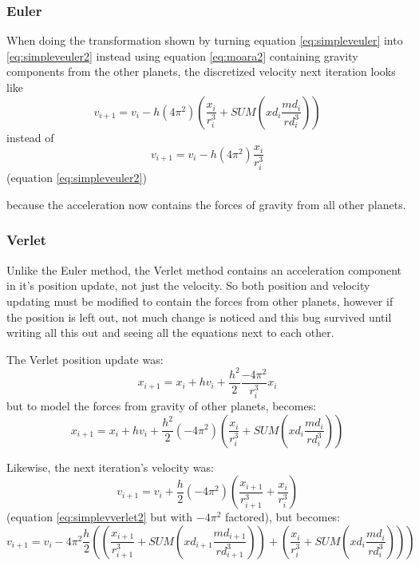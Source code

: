 \documentclass[12pt]{article} %
\begin{document}
\subsubsection{Euler}
When doing the transformation shown by turning equation \eqref{eq:simpleveuler} into \eqref{eq:simpleveuler2} instead using equation \eqref{eq:moara2} containing gravity components from the other planets, the discretized velocity next iteration looks like
\begin{equation}
	v_{i+1} = v_i - h(4\pi^2)(\frac{x_i}{r_i^3} + SUM(xd_i\frac{md_i}{rd_i^3}))
	\label{moarveuler}
\end{equation}
instead of
\begin{equation}	
	v_{i+1} = v_i - h(4\pi^2)\frac{x_i}{r_i^3}
\end{equation}
(equation \eqref{eq:simpleveuler2})

because the acceleration now contains the forces of gravity from all other planets.

\subsubsection{Verlet}
Unlike the Euler method, the Verlet method contains an acceleration component in it's position update, not just the velocity. So both position and velocity updating must be modified to contain the forces from other planets, however if the position is left out, not much change is noticed and this bug survived until writing all this out and seeing all the equations next to each other.

The Verlet position update was:
\[
	x_{i+1} = x_i + hv_i + \frac{h^2}{2}\frac{-4\pi^2}{r_i^3}x_i
\]
but to model the forces from gravity of other planets, becomes:
\begin{equation}
	x_{i+1} = x_i + hv_i + \frac{h^2}{2}(-4\pi^2)(\frac{x_i}{r_i^3} + SUM(xd_i\frac{md_i}{rd_i^3}))
\end{equation}

Likewise, the next iteration's velocity was:
\[
	v_{i+1} = v_i + \frac{h}{2}(-4\pi^2)\left(\frac{x_{i+1}}{r_{i+1}^3} + 
	\frac{x_i}{r_i^3}\right)
\]
(equation \eqref{eq:simplevverlet2} but with $-4\pi^2$ factored), but becomes:
\begin{equation}
	v_{i+1} = v_i -4\pi^2\frac{h}{2}\left((\frac{x_{i+1}}{r_{i+1}^3} 
	+ SUM(xd_{i+1}\frac{md_{i+1}}{rd_{i+1}^3})) + (\frac{x_i}{r_i^3} 
	+ SUM(xd_i\frac{md_i}{rd_i^3}))\right)
	\label{eq:moarvverlet}
\end{equation}
\end{document}

